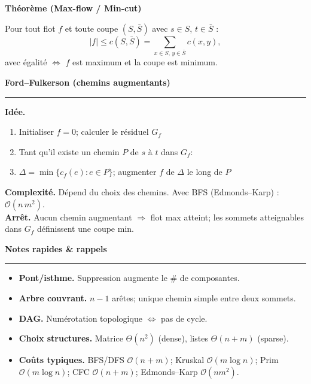 \documentclass[9pt,a4paper]{article}
\newcommand{\bigO}{\mathcal{O}}
\newcommand{\sect}[1]{\vspace{1ex}\textbf{\large #1}\par\vspace{0.3ex}\hrule\vspace{0.6ex}}
\newcommand{\subsect}[1]{\vspace{0.4ex}\textbf{#1}\par}
\begin{document}
\begin{multicols}{3}
    \subsect{Théorème (Max-flow / Min-cut)}
    Pour tout flot $f$ et toute coupe $(S,\bar S)$ avec $s\in S$, $t\in \bar S$ :
    \[
        |f| \le c(S,\bar S)=\sum_{x\in S,\,y\in\bar S} c(x,y),
    \]
    avec égalité $\Leftrightarrow$ $f$ est maximum et la coupe est minimum.

    \sect{Ford--Fulkerson (chemins augmentants)}
    \textbf{Idée.}
    \begin{enumerate}
        \item Initialiser $f=0$; calculer le résiduel $G_f$
        \item Tant qu'il existe un chemin $P$ de $s$ à $t$ dans $G_f$:
        \item \quad $\Delta=\min\{c_f(e): e\in P\}$; augmenter $f$ de $\Delta$ le long de $P$
    \end{enumerate}
    \textbf{Complexité.} Dépend du choix des chemins. Avec BFS (Edmonds--Karp) : $\bigO(n\,m^2)$.\\
    \textbf{Arrêt.} Aucun chemin augmentant $\Rightarrow$ flot max atteint; les sommets atteignables dans $G_f$ définissent une coupe min.

    \sect{Notes rapides \& rappels}
    \begin{itemize}
        \item \textbf{Pont/isthme.} Suppression augmente le \# de composantes.
        \item \textbf{Arbre couvrant.} $n-1$ arêtes; unique chemin simple entre deux sommets.
        \item \textbf{DAG.} Numérotation topologique $\Leftrightarrow$ pas de cycle.
        \item \textbf{Choix structures.} Matrice $\Theta(n^2)$ (dense), listes $\Theta(n+m)$ (sparse).
        \item \textbf{Coûts typiques.} BFS/DFS $\bigO(n+m)$; Kruskal $\bigO(m\log n)$; Prim $\bigO(m\log n)$; CFC $\bigO(n+m)$; Edmonds--Karp $\bigO(n m^2)$.
    \end{itemize}

\end{multicols}
\end{document}
